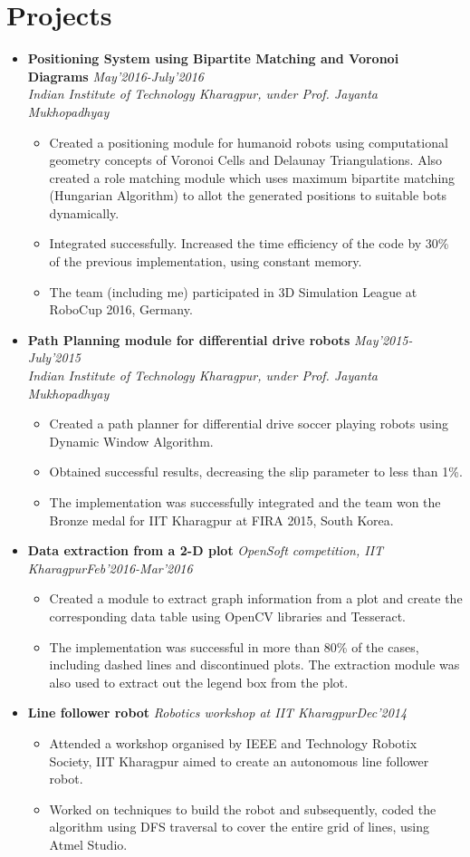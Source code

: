 \documentclass[11pt,a4paper]{moderncv}
\newcommand{\experience}[4]{
  \vspace{0.1cm}
\item \textbf{\large{#1}} \textit{#2}\hfill\textit{#3}
  \begin{itemize}[leftmargin=*]
    \setlength\itemsep{0em} #4
  \end{itemize}
}
\newcommand{\experiencetwo}[4]{
  \vspace{0.1cm}
\item \textbf{\large{#1}} \hfill\textit{#3}\\\textit{#2}
  \begin{itemize}[leftmargin=*]
    \setlength\itemsep{0em} #4
  \end{itemize}
}
\begin{document}
\section*{Projects}
\begin{itemize}
  \setlength\itemsep{0.5em}

  \experiencetwo{Positioning System using Bipartite Matching and Voronoi Diagrams}{Indian Institute of Technology Kharagpur, under Prof. Jayanta Mukhopadhyay}{May'2016-July'2016}{
   \item Created a positioning module for humanoid robots using computational geometry concepts of Voronoi Cells and Delaunay Triangulations. Also created a role matching module which uses maximum bipartite matching (Hungarian Algorithm) to allot the generated positions to suitable bots dynamically.  
  \item Integrated successfully. Increased the time efficiency of the code
    by 30\% of the previous implementation, using constant memory. 
  \item The team (including me) participated in 3D Simulation League at RoboCup 2016, Germany.
  }
  
  \experiencetwo{Path Planning module for differential drive robots}{Indian Institute of Technology Kharagpur, under Prof. Jayanta Mukhopadhyay}{May'2015-July'2015}{
  \item Created a path planner for differential drive soccer playing robots 
    using Dynamic Window Algorithm.
  \item Obtained successful results, decreasing the slip parameter to less
    than 1\%.  
  \item The implementation was successfully integrated and the team won the 
    Bronze medal for IIT Kharagpur at FIRA 2015, South Korea.
  }

  \experience{Data extraction from a 2-D plot}{OpenSoft competition, IIT Kharagpur}{Feb'2016-Mar'2016}{
  \item Created a module to extract graph information from a plot and create the corresponding data table using OpenCV libraries and Tesseract.
  \item The implementation was successful in more than 80\% of the cases, including dashed lines and discontinued plots. The extraction module was also used to extract out the legend box from the plot.
  }

  \experience{Line follower robot}{Robotics workshop at IIT Kharagpur}{Dec'2014}{
  \item Attended a workshop organised by IEEE and Technology Robotix Society, IIT Kharagpur aimed to create an autonomous line follower robot.
  \item Worked on techniques to build the robot and subsequently, coded the algorithm using DFS traversal to cover the entire grid of lines, using Atmel Studio.
  }


\end{itemize}
\end{document}
